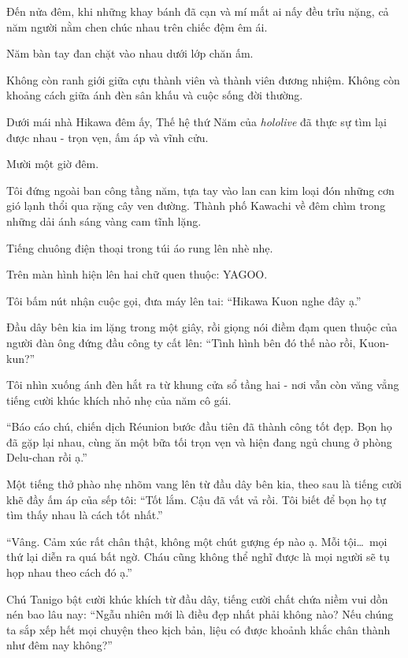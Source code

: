 \documentclass[../main.tex]{subfiles}
\begin{document}
Đến nửa đêm, khi những khay bánh đã cạn và mí mắt ai nấy đều trĩu nặng, cả năm người nằm chen chúc nhau trên chiếc đệm êm ái.

Năm bàn tay đan chặt vào nhau dưới lớp chăn ấm.

Không còn ranh giới giữa cựu thành viên và thành viên đương nhiệm. Không còn khoảng cách giữa ánh đèn sân khấu và cuộc sống đời thường.

Dưới mái nhà Hikawa đêm ấy, Thế hệ thứ Năm của \textit{hololive} đã thực sự tìm lại được nhau - trọn vẹn, ấm áp và vĩnh cửu.

\ct


Mười một giờ đêm.

Tôi đứng ngoài ban công tầng năm, tựa tay vào lan can kim loại đón những cơn gió lạnh thổi qua rặng cây ven đường. Thành phố Kawachi về đêm chìm trong những dải ánh sáng vàng cam tĩnh lặng.

Tiếng chuông điện thoại trong túi áo rung lên nhè nhẹ.

Trên màn hình hiện lên hai chữ quen thuộc: YAGOO.

Tôi bấm nút nhận cuộc gọi, đưa máy lên tai: ``Hikawa Kuon nghe đây ạ.''

Đầu dây bên kia im lặng trong một giây, rồi giọng nói điềm đạm quen thuộc của người đàn ông đứng đầu công ty cất lên: ``Tình hình bên đó thế nào rồi, Kuon-kun?''

Tôi nhìn xuống ánh đèn hắt ra từ khung cửa sổ tầng hai - nơi vẫn còn văng vẳng tiếng cười khúc khích nhỏ nhẹ của năm cô gái.

``Báo cáo chú, chiến dịch Réunion bước đầu tiên đã thành công tốt đẹp. Bọn họ đã gặp lại nhau, cùng ăn một bữa tối trọn vẹn và hiện đang ngủ chung ở phòng Delu-chan rồi ạ.''

Một tiếng thở phào nhẹ nhõm vang lên từ đầu dây bên kia, theo sau là tiếng cười khẽ đầy ấm áp của sếp tôi: ``Tốt lắm. Cậu đã vất vả rồi. Tôi biết để bọn họ tự tìm thấy nhau là cách tốt nhất.''

``Vâng. Cảm xúc rất chân thật, không một chút gượng ép nào ạ. Mỗi tội\dots\ mọi thứ lại diễn ra quá bất ngờ. Cháu cũng không thể nghĩ được là mọi người sẽ tụ họp nhau theo cách đó ạ.''

Chú Tanigo bật cười khúc khích từ đầu dây, tiếng cười chất chứa niềm vui dồn nén bao lâu nay: ``Ngẫu nhiên mới là điều đẹp nhất phải không nào? Nếu chúng ta sắp xếp hết mọi chuyện theo kịch bản, liệu có được khoảnh khắc chân thành như đêm nay không?''
\end{document}
